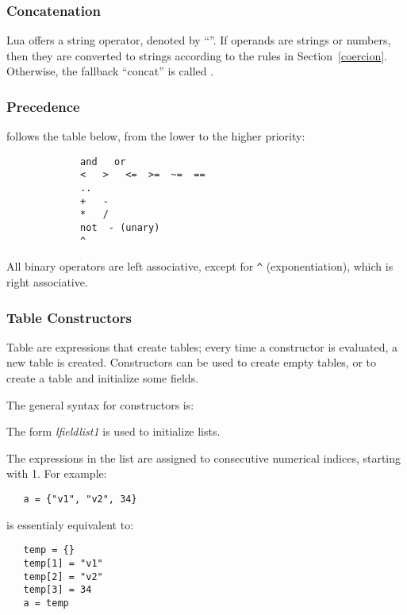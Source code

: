 \subsubsection{Concatenation}
Lua offers a string  operator,
denoted by ``''.
If operands are strings or numbers, then they are converted to
strings according to the rules in Section~\ref{coercion}.
Otherwise, the fallback ``concat'' is called .

\subsubsection{Precedence}
 follows the table below,
from the lower to the higher priority:
\begin{verbatim}
             and   or
             <   >   <=  >=  ~=  ==
             ..
             +   -
             *   /
             not  - (unary)
             ^
\end{verbatim}
All binary operators are left associative,
except for \verb'^' (exponentiation),
which is right associative.

\subsubsection{Table Constructors} \label{tableconstructor}
Table  are expressions that create tables;
every time a constructor is evaluated, a new table is created.
Constructors can be used to create empty tables,
or to create a table and initialize some fields.

The general syntax for constructors is:
\begin{Produc}
\end{Produc}

The form {\em lfieldlist1\/} is used to initialize lists.
\begin{Produc}
\end{Produc}%
The expressions in the list are assigned to consecutive numerical indices,
starting with 1.
For example:
\begin{verbatim}
   a = {"v1", "v2", 34}
\end{verbatim}
is essentialy equivalent to:
\begin{verbatim}
   temp = {}
   temp[1] = "v1"
   temp[2] = "v2"
   temp[3] = 34
   a = temp
\end{verbatim}

